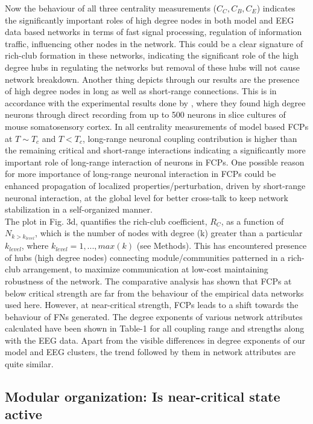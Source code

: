 \documentclass[preprintnumbers,amsmath,amssymb,onecolumn]{revtex4}
\begin{document}
{\noindent}Now the behaviour of all three centrality measurements ($C_C,C_B,C_E$) indicates the significantly important roles of high degree nodes in both model and EEG data based networks in terms of fast signal processing, regulation of information traffic, influencing other nodes in the network. This could be a clear signature of rich-club formation in these networks, indicating the significant role of the high degree hubs in regulating the networks but removal of these hubs will not cause network breakdown. Another thing depicts through our results are the presence of high degree nodes in long as well as short-range connections. This is in accordance with the experimental results done by \citep{Nigam2016}, where they found high degree neurons through direct recording from up to 500 neurons in slice cultures of mouse somatosensory cortex. In all centrality measurements of model based FCPs at $T\sim T_c$ and $T<T_c$, long-range neuronal coupling contribution is higher than the remaining critical and short-range interactions indicating a significantly more important role of long-range interaction of neurons in FCPs. One possible reason for more importance of long-range neuronal interaction in FCPs could be enhanced propagation of localized properties/perturbation, driven by short-range neuronal interaction, at the global level for better cross-talk to keep network stabilization in a self-organized manner.\\

{\noindent}The plot in Fig. 3d, quantifies the rich-club coefficient, $R_{C}$, as a function of $N_{k>k_{level}}$, which is the number of nodes with degree (k) greater than a particular $k_{level}$, where $k_{level}=1,...,max(k)$ (see Methods). This has encountered presence of hubs (high degree nodes) connecting module/communities patterned in a rich-club arrangement, to maximize communication at low-cost maintaining robustness of the network. The comparative analysis has shown that FCPs at below critical strength are far from the behaviour of the empirical data networks used here. However, at near-critical strength, FCPs leads to a shift towards the behaviour of FNs generated. The degree exponents of various network attributes calculated have been shown in Table-1 for all coupling range and strengths along with the EEG data. Apart from the visible differences in degree exponents of our model and EEG clusters, the trend followed by them in network attributes are quite similar.

\subsection{Modular organization: Is near-critical state active}
\end{document}
